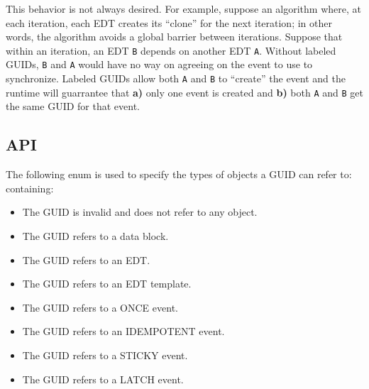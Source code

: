 This behavior is not always desired. For example, suppose an algorithm
where, at each iteration, each EDT creates its ``clone'' for the next
iteration; in other words, the algorithm avoids a global barrier
between iterations. Suppose that within an iteration, an EDT \texttt{B}
depends on another EDT \texttt{A}. Without labeled GUIDs, \texttt{B}
and \texttt{A} would have no way on agreeing on the event to use to
synchronize. Labeled GUIDs allow both \texttt{A} and \texttt{B} to
``create'' the event and the runtime will guarrantee that {\bf a)}
only one event is created and {\bf b)} both \texttt{A} and \texttt{B}
get the same GUID for that event.
\subsection{API}
The following enum is used to specify the types of objects a GUID can
refer to:
\hypertarget{type_ocrGuidUserKind}{}
containing:
\begin{itemize}
\item {} The GUID is invalid and does not refer
  to any object.
\item {} The GUID refers to a data block.
\item {} The GUID refers to an EDT.
\item {} The GUID refers to an EDT
  template.
\item {} The GUID refers to a ONCE event.
\item {} The GUID refers to an IDEMPOTENT
  event.
\item {} The GUID refers to a STICKY
  event.
\item {} The GUID refers to a LATCH
  event.
\end{itemize}


